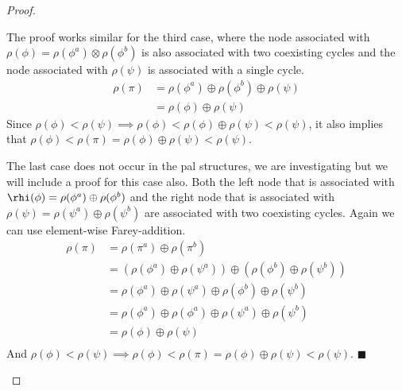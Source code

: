 \begin{proof}
\begin{itemize}
			The proof works similar for the third case, where the node associated with $\rho(\phi) = \rho(\phi^a) \otimes \rho(\phi^b)$ is also associated with two coexisting cycles and the node associated with $\rho(\psi)$ is associated with a single cycle.
			\begin{align*}
				\rho(\pi) & = \rho(\phi^a) \oplus \rho(\phi^b) \oplus \rho(\psi) \\
				          & = \rho(\phi) \oplus \rho(\psi)
			\end{align*}
			Since $\rho(\phi) < \rho(\psi) \implies \rho(\phi) < \rho(\phi) \oplus \rho(\psi) < \rho(\psi)$, it also implies that $ \rho(\phi) < \rho(\pi) = \rho(\phi) \oplus \rho(\psi) < \rho(\psi)$.

			The last case does not occur in the \gls{pal} structures, we are investigating but we will include a proof for this case also.
			Both the left node that is associated with $\rhi(\phi) = \rho(\phi^a) \oplus \rho(\phi^b)$ and the right node that is associated with $\rho(\psi) = \rho(\psi^a) \oplus \rho(\psi^b)$ are associated with two coexisting cycles.
			Again we can use element-wise Farey-addition.
			\begin{align*}
				\rho(\pi) & = \rho(\pi^a) \oplus \rho(\pi^b)                                                                     \\
				          & = \left(\rho(\phi^a) \oplus \rho(\psi^a)\right) \oplus \left(\rho(\phi^b) \oplus \rho(\psi^b)\right) \\
				          & = \rho(\phi^a) \oplus \rho(\psi^a) \oplus \rho(\phi^b) \oplus \rho(\psi^b)                           \\
				          & = \rho(\phi^a) \oplus \rho(\phi^a) \oplus \rho(\psi^a) \oplus \rho(\psi^b)                           \\
				          & = \rho(\phi) \oplus \rho(\psi)                                                                       \\
			\end{align*}
			And $\rho(\phi) < \rho(\psi) \implies \rho(\phi) < \rho(\pi) = \rho(\phi) \oplus \rho(\psi) < \rho(\psi)$.
			\hfill $\blacksquare$
	\end{itemize}
\end{proof}
